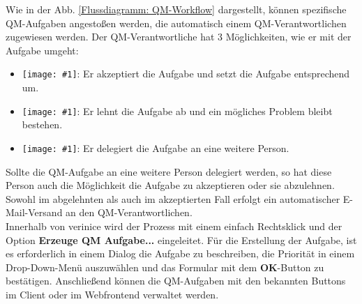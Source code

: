 \documentclass[a4paper,10pt]{book}
\newcommand{\icon}[1]{\texttt{[image: \#1]}}
\begin{document}
Wie in der Abb. \ref{Flussdiagramm: QM-Workflow} dargestellt, können spezifische QM-Aufgaben angestoßen werden, die automatisch einem QM-Verantwortlichen zugewiesen
werden. Der QM-Verantwortliche hat 3 Möglichkeiten, wie er mit der Aufgabe umgeht:
\begin{itemize}
\item \icon{Icon/Akzeptieren.png}: Er akzeptiert die Aufgabe und setzt die Aufgabe entsprechend um.
\item \icon{Icon/Ablehnen.png}: Er lehnt die Aufgabe ab und ein mögliches Problem bleibt bestehen.
\item \icon{Icon/waehle_person.png}: Er delegiert die Aufgabe an eine weitere Person.
\end{itemize}
Sollte die QM-Aufgabe an eine weitere Person delegiert werden, so hat diese Person auch die Möglichkeit die Aufgabe zu akzeptieren oder sie
abzulehnen. Sowohl im abgelehnten als auch im akzeptierten Fall erfolgt ein automatischer E-Mail-Versand an den QM-Verantwortlichen.
\newline\\
Innerhalb von verinice wird der Prozess mit einem einfach Rechtsklick und der Option \textbf{Erzeuge QM Aufgabe...} eingeleitet. Für die Erstellung der Aufgabe,
ist es erforderlich in einem Dialog die Aufgabe zu beschreiben, die Priorität in einem Drop-Down-Menü auszuwählen und das Formular mit dem \textbf{OK}-Button zu bestätigen.
Anschließend können die QM-Aufgaben mit den bekannten Buttons im Client oder im Webfrontend verwaltet werden.
\end{document}
